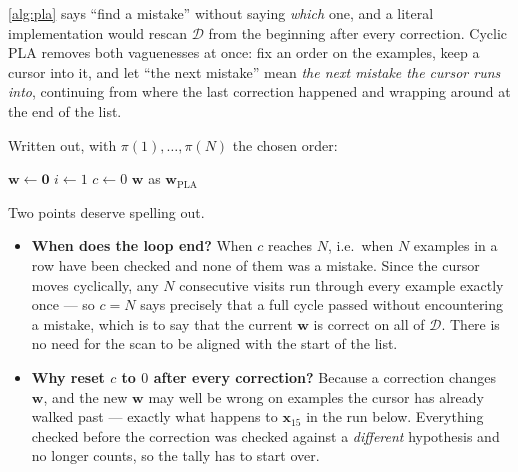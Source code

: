 \autoref{alg:pla} says ``find a mistake'' without saying \emph{which} one, and a
literal implementation would rescan \(\mathcal{D}\) from the beginning after
every correction. Cyclic PLA removes both vaguenesses at once: fix an order on
the examples, keep a cursor into it, and let ``the next mistake'' mean
\emph{the next mistake the cursor runs into}, continuing from where the last
correction happened and wrapping around at the end of the list.

Written out, with \(\pi(1), \dots , \pi(N)\) the chosen order:

\begin{algorithm}[H]
    \caption{Cyclic PLA}\label{alg:cyclic-pla}
    \(\bm{w} \gets \bm{0}\)\;
    \(i \gets 1\) 
    \(c \gets 0\) 
    \Return \(\bm{w}\) as \(\bm{w}_{\mathrm{PLA}}\)\;
\end{algorithm}

Two points deserve spelling out.

\begin{itemize}
    \item \textbf{When does the loop end?} When \(c\) reaches \(N\), i.e.\ when
        \(N\) examples in a row have been checked and none of them was a
        mistake. Since the cursor moves cyclically, any \(N\) consecutive visits
        run through every example exactly once --- so \(c = N\) says precisely
        that a full cycle passed without encountering a mistake, which is to say
        that the current \(\bm{w}\) is correct on all of \(\mathcal{D}\). There
        is no need for the scan to be aligned with the start of the list.
    \item \textbf{Why reset \(c\) to \(0\) after every correction?} Because a
        correction changes \(\bm{w}\), and the new \(\bm{w}\) may well be wrong
        on examples the cursor has already walked past --- exactly what happens
        to \(\bm{x}_{15}\) in the run below. Everything checked before the
        correction was checked against a \emph{different} hypothesis and no
        longer counts, so the tally has to start over.
\end{itemize}

